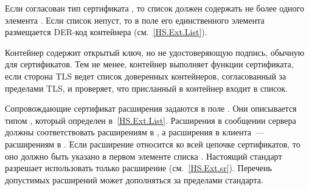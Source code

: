 
Если согласован тип сертификата , то 
список  должен содержать не более одного 
элемента . Если список непуст, то в поле 
 его единственного элемента размещается 
DER-код контейнера  (см.~\ref{HS.Ext.List}).

\begin{note*}
Контейнер  содержит открытый ключ, но не 
удостоверяющую подпись, обычную для сертификатов. Тем не менее, 
контейнер выполняет функции сертификата, если сторона TLS ведет список
доверенных контейнеров, согласованный за пределами TLS, и проверяет,
что присланный в  контейнер входит в список.
\end{note*}



Сопровождающие сертификат расширения задаются в поле 
.
%
Они описывается типом , который определен в~\ref{HS.Ext.List}.
%
Расширения в сообщении  сервера должны соответствовать 
расширениям в ,  
а расширения в  клиента~--- расширениям в 
.
%
Если расширение относится ко всей цепочке сертификатов, то оно должно быть 
указано в первом элементе списка .
%
Настоящий стандарт разрешает использовать только расширение 
 (см.~\ref{HS.Ext.sr}). Перечень допустимых 
расширений может дополняться за пределами стандарта.

